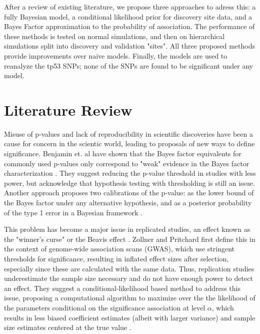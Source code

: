 \documentclass[AMA,STIX1COL]{WileyNJD-v2}\usepackage[]{graphicx}\usepackage[]{color}
\begin{document}
After a review of existing literature, we propose three approaches to adress this: a fully Bayesian model, a conditional likelihood prior for discovery site data, and a Bayes Factor approximation to the probability of association. The performance of these methods is tested on normal simulations, and then on hierarchical simulations split into discovery and validation "sites". All three proposed methods provide improvements over naive models. Finally, the models are used to reanalyze the tp53 SNPs; none of the SNPs are found to be significant under any model.

\section{Literature Review}\label{sec:lit}

Misuse of p-values and lack of reproducibility in scientific discoveries have been a cause for concern in the scientic world, leading to proposals of new ways to define significance. Benjamin et. al have shown that the Bayes factor equivalents for commonly used p-values only correspond to "weak" evidence in the Bayes factor characterization \cite{benjamin2017redefine}. They suggest reducing the p-value threshold in studies with less power, but acknowledge that hypothesis testing with thresholding is still an issue. Another approach proposes two calibrations of the p-value: as the lower bound of the Bayes factor under any alternative hypothesis, and as a posterior probability of the type 1 error in a Bayesian framework \cite{sellke2001calibration}.

This problem has become a major issue in replicated studies, an effect known as the "winner's curse" \cite{zollner2007overcoming} or the Beavis effect \cite{xu2003theoretical}. Zollner and Pritchard first define this in the context of genome-wide association scans (GWAS), which use stringent thresholds for significance, resulting in inflated effect sizes after selection, especially since these are calculated with the same data. Thus, replication studies underestimate the sample size necessary and do not have enough power to detect an effect. They suggest a conditional-likelihood based method to address this issue, proposing a computational algorithm to maximize over the the likelihood of the parameters conditional on the significance association at level $\alpha$, which results in less biased coefficient estimates (albeit with larger variance) and sample size estimates centered at the true value \cite{zollner2007overcoming}.
\end{document}

